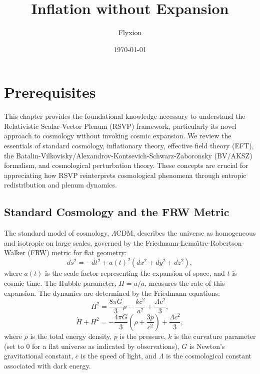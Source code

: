 \documentclass[12pt, a4paper, openany]{book}
\title{Inflation without Expansion}
\author{Flyxion}
\date{\today}
\theoremstyle{definition}
\begin{document}
\maketitle
\tableofcontents

\chapter{Prerequisites}
This chapter provides the foundational knowledge necessary to understand the Relativistic Scalar-Vector Plenum (RSVP) framework, particularly its novel approach to cosmology without invoking cosmic expansion. We review the essentials of standard cosmology, inflationary theory, effective field theory (EFT), the Batalin-Vilkovisky/Alexandrov-Kontsevich-Schwarz-Zaboronsky (BV/AKSZ) formalism, and cosmological perturbation theory. These concepts are crucial for appreciating how RSVP reinterprets cosmological phenomena through entropic redistribution and plenum dynamics.

\section{Standard Cosmology and the FRW Metric}
The standard model of cosmology, $\Lambda$CDM, describes the universe as homogeneous and isotropic on large scales, governed by the Friedmann-Lema\^{\i}tre-Robertson-Walker (FRW) metric for flat geometry:
\begin{equation}
ds^2 = -dt^2 + a(t)^2 \left( dx^2 + dy^2 + dz^2 \right),
\end{equation}
where $a(t)$ is the scale factor representing the expansion of space, and $t$ is cosmic time. The Hubble parameter, $H = \dot{a}/a$, measures the rate of this expansion. The dynamics are determined by the Friedmann equations:
\begin{equation}
H^2 = \frac{8\pi G}{3} \rho - \frac{kc^2}{a^2} + \frac{\Lambda c^2}{3},
\end{equation}
\begin{equation}
\dot{H} + H^2 = -\frac{4\pi G}{3} \left( \rho + \frac{3p}{c^2} \right) + \frac{\Lambda c^2}{3},
\end{equation}
where $\rho$ is the total energy density, $p$ is the pressure, $k$ is the curvature parameter (set to 0 for a flat universe as indicated by observations), $G$ is Newton's gravitational constant, $c$ is the speed of light, and $\Lambda$ is the cosmological constant associated with dark energy.
\end{document}
